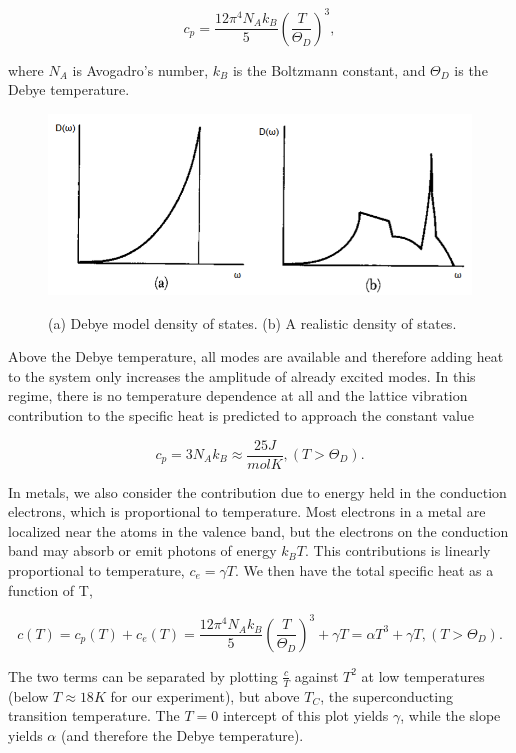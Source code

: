 \documentclass{article}
\begin{document}
\begin{equation}
	c_p = \frac{12 \pi^4 N_A k_B}{5}(\frac{T}{\Theta_D})^3,
\end{equation}

where $N_A$ is Avogadro's number, $k_B$ is the Boltzmann constant, and $\Theta_D$ is the Debye temperature.

\begin{figure}[!htb]
	\centering
	\includegraphics[scale=1.]{plots/fig_1.png}
 	\label{debye}
	\caption{(a) Debye model density of states. (b) A realistic density of states.\cite{lab manual}}
\end{figure}

Above the Debye temperature, all modes are available and therefore adding heat to the system only increases the amplitude of already excited modes. In this regime, there is no temperature dependence at all and the lattice vibration contribution to the specific heat is predicted to approach the constant value

\begin{equation}
	c_p = 3 N_A k_B \approx \frac{25 J}{mol K},  (T > \Theta_D).
\end{equation}

In metals, we also consider the contribution due to energy held in the conduction electrons, which is proportional to temperature. Most electrons in a metal are localized near the atoms in the valence band, but the electrons on the conduction band may absorb or emit photons of energy $k_B T$. This contributions is linearly proportional to temperature, $c_e = \gamma T$. We then have the total specific heat as a function of T,

\begin{equation}
	c(T) = c_p(T) + c_e(T) = \frac{12 \pi^4 N_A k_B}{5}(\frac{T}{\Theta_D})^3 + \gamma T = \alpha T^3 + \gamma T, (T > \Theta_D).
\end{equation}

The two terms can be separated by plotting $\frac{c}{T}$ against $T^2$ at low temperatures (below $T \approx 18 K$ for our experiment), but above $T_C$, the superconducting transition temperature. The $T = 0$ intercept of this plot yields $\gamma$, while the slope yields $\alpha$ (and therefore the Debye temperature)\cite{lab manual}.
\end{document}
